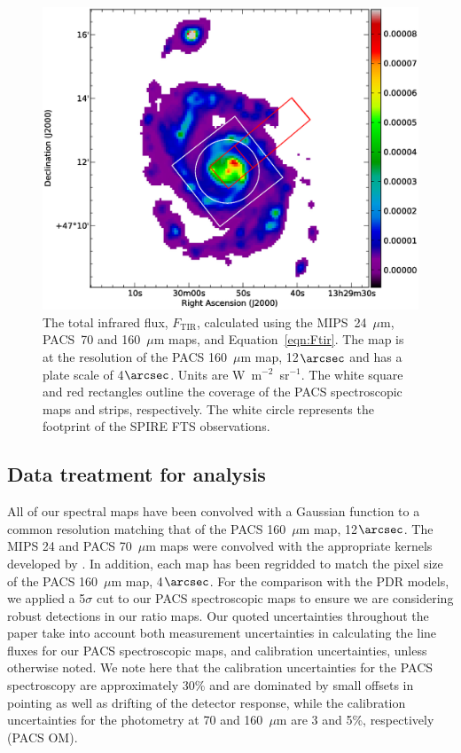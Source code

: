 \documentclass[preprint2]{aastex}
\begin{document}
\begin{figure}[h]
\includegraphics[width=\columnwidth]{Figure1}
\caption{The total infrared flux, $F_{\mathrm{TIR}}$, calculated using the MIPS~24~$\mu$m, PACS~70 and 160~$\mu$m maps, and Equation~\ref{eqn:Ftir}.  The map is at the resolution of the PACS 160~$\mu$m map, 12$\arcsec$ and has a plate scale of 4$\arcsec$.  Units are W~m$^{-2}$~sr$^{-1}$.  The white square and red rectangles outline the coverage of the PACS spectroscopic maps and strips, respectively.  The white circle represents the footprint of the SPIRE FTS observations.}
\label{fig:Ltir}
\end{figure}

\subsection{Data treatment for analysis}\label{data_treatment}
All of our spectral maps have been convolved with a Gaussian function to a common resolution matching that of the PACS 160~$\mu$m map, 12$\arcsec$.  The MIPS 24 and PACS 70~$\mu$m maps were convolved with the appropriate kernels developed by \citet{2011PASP..123.1218A}.  In addition, each map has been regridded to match the pixel size of the PACS 160~$\mu$m map, 4$\arcsec$.  For the comparison with the PDR models, we applied a 5$\sigma$ cut to our PACS spectroscopic maps to ensure we are considering robust detections in our ratio maps.  Our quoted uncertainties throughout the paper take into account both measurement uncertainties in calculating the line fluxes for our PACS spectroscopic maps, and calibration uncertainties, unless otherwise noted.  We note here that the calibration uncertainties for the PACS spectroscopy are approximately 30\% and are dominated by small offsets in pointing as well as drifting of the detector response, while the calibration uncertainties for the photometry at 70 and 160~$\mu$m are 3 and 5\%, respectively (PACS OM).
\end{document}
